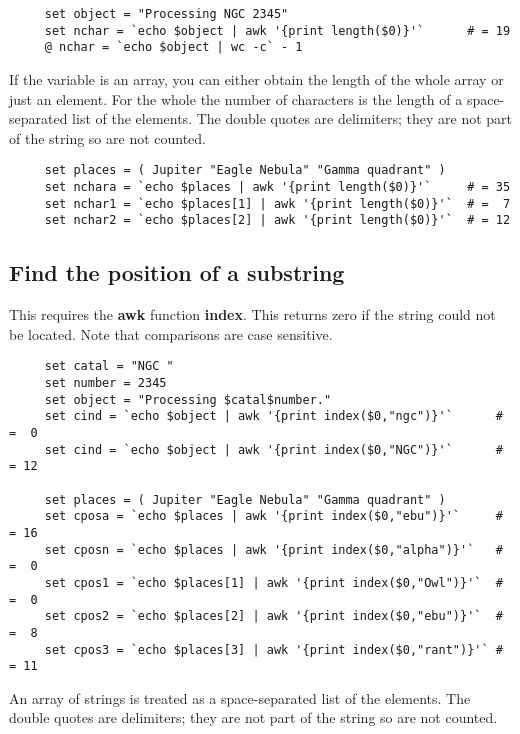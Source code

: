 \small
\begin{verbatim}
     set object = "Processing NGC 2345"
     set nchar = `echo $object | awk '{print length($0)}'`      # = 19
     @ nchar = `echo $object | wc -c` - 1
\end{verbatim}
\normalsize

If the variable is an array, you can either obtain the length of the
whole array or just an element.  For the whole the number of
characters is the length of a space-separated list of the elements.
The double quotes are delimiters; they are not part of the string so
are not counted.

\small
\begin{verbatim}
     set places = ( Jupiter "Eagle Nebula" "Gamma quadrant" )
     set nchara = `echo $places | awk '{print length($0)}'`     # = 35
     set nchar1 = `echo $places[1] | awk '{print length($0)}'`  # =  7
     set nchar2 = `echo $places[2] | awk '{print length($0)}'`  # = 12
\end{verbatim}
\normalsize

\subsection{Find the position of a
substring\label{sc4_se_string_substr}}

This requires the {\bf awk} function {\bf index}.  This returns zero if
the string could not be located.  Note that comparisons are case
sensitive.

\small
\begin{verbatim}
     set catal = "NGC "
     set number = 2345
     set object = "Processing $catal$number."
     set cind = `echo $object | awk '{print index($0,"ngc")}'`      # =  0
     set cind = `echo $object | awk '{print index($0,"NGC")}'`      # = 12

     set places = ( Jupiter "Eagle Nebula" "Gamma quadrant" )
     set cposa = `echo $places | awk '{print index($0,"ebu")}'`     # = 16
     set cposn = `echo $places | awk '{print index($0,"alpha")}'`   # =  0
     set cpos1 = `echo $places[1] | awk '{print index($0,"Owl")}'`  # =  0
     set cpos2 = `echo $places[2] | awk '{print index($0,"ebu")}'`  # =  8
     set cpos3 = `echo $places[3] | awk '{print index($0,"rant")}'` # = 11
\end{verbatim}
\normalsize
An array of strings is treated as a space-separated list of the elements.
The double quotes are delimiters; they are not part of the string so
are not counted.

